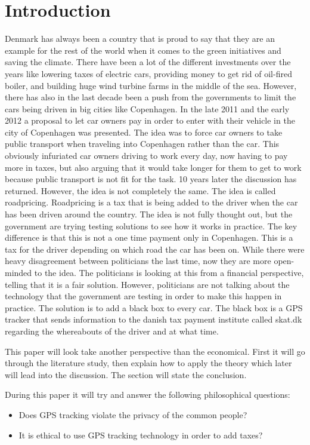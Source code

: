 \section{Introduction}
Denmark has always been a country that is proud to say that they are an example for the rest of the world when it comes to the green initiatives and saving the climate. There have been a lot of the different investments over the years like lowering taxes of electric cars, providing money to get rid of oil-fired boiler, and building huge wind turbine farms in the middle of the sea. However, there has also in the last decade been a push from the governments to limit the cars being driven in big cities like Copenhagen. In the late 2011 and the early 2012 a proposal to let car owners pay in order to enter with their vehicle in the city of Copenhagen was presented. The idea was to  force car owners to take public transport when traveling into Copenhagen rather than the car. This obviously infuriated car owners driving to work every day, now having to pay more in taxes, but also arguing that it would take longer for them to get to work because public transport is not fit for the task. 10 years later the discussion has returned. However, the idea is not completely the same. The idea is called roadpricing. Roadpricing is a tax that is being added to the driver when the car has been driven around the country. The idea is not fully thought out, but the government are trying testing solutions to see how it works in practice. The key difference is that this is not a one time payment only in Copenhagen. This is a tax for the driver depending on which road the car has been on. While there were heavy disagreement between politicians the last time, now they are more open-minded to the idea. The politicians is looking at this from a financial perspective, telling that it is a fair solution. However, politicians are not talking about the technology that the government are testing in order to make this happen in practice. The solution is to add a black box to every car. The black box is a GPS tracker that sends information to the danish tax payment institute called skat.dk regarding the whereabouts of the driver and at what time. \newline

\noindent This paper will look take another perspective than the economical. First it will go through the literature study, then explain how to apply the theory which later will lead into the discussion. The section will state the conclusion.

During this paper it will try and answer the following philosophical questions:
\begin{itemize}
    \item Does GPS tracking violate the privacy of the common people?
    \item It is ethical to use GPS tracking technology in order to add taxes?
\end{itemize}